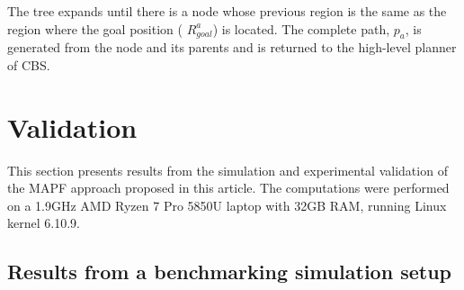\documentclass[letterpaper, 10 pt, conference]{ieeeconf}  %
\begin{document}
The tree expands until there is a node whose previous region is the same as the region where the goal position ( $R_{goal}^a$) is located. The complete path, $p_a$, is generated from the node and its parents and is returned to the high-level planner of CBS. 
\section{Validation}
This section presents results from the simulation and experimental validation of the MAPF approach proposed in this article. The computations were performed on a 1.9GHz AMD Ryzen 7 Pro 5850U laptop with 32GB RAM, running Linux kernel 6.10.9.
\subsection{Results from a benchmarking simulation setup}
\end{document}
